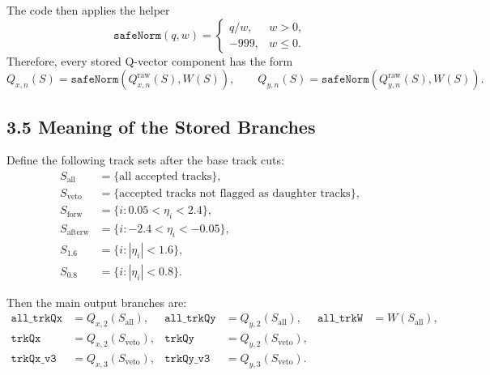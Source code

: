 \documentclass[11pt]{article}
\begin{document}
The code then applies the helper
\[
\texttt{safeNorm}(q,w) =
\begin{cases}
q/w, & w > 0,\\
-999, & w \le 0.
\end{cases}
\]
Therefore, every stored Q-vector component has the form
\[
Q_{x,n}(S) = \texttt{safeNorm}\!\left(Q_{x,n}^{\mathrm{raw}}(S), W(S)\right),\qquad
Q_{y,n}(S) = \texttt{safeNorm}\!\left(Q_{y,n}^{\mathrm{raw}}(S), W(S)\right).
\]

\subsection*{3.5 Meaning of the Stored Branches}

Define the following track sets after the base track cuts:
\begin{align*}
S_{\mathrm{all}} &= \{\text{all accepted tracks}\}, \\
S_{\mathrm{veto}} &= \{\text{accepted tracks not flagged as daughter tracks}\}, \\
S_{\mathrm{forw}} &= \{i : 0.05 < \eta_i < 2.4\}, \\
S_{\mathrm{afterw}} &= \{i : -2.4 < \eta_i < -0.05\}, \\
S_{1.6} &= \{i : |\eta_i| < 1.6\}, \\
S_{0.8} &= \{i : |\eta_i| < 0.8\}.
\end{align*}

Then the main output branches are:
\begin{align*}
\texttt{all\_trkQx} &= Q_{x,2}(S_{\mathrm{all}}), &
\texttt{all\_trkQy} &= Q_{y,2}(S_{\mathrm{all}}), &
\texttt{all\_trkW} &= W(S_{\mathrm{all}}), \\
\texttt{trkQx} &= Q_{x,2}(S_{\mathrm{veto}}), &
\texttt{trkQy} &= Q_{y,2}(S_{\mathrm{veto}}), \\
\texttt{trkQx\_v3} &= Q_{x,3}(S_{\mathrm{veto}}), &
\texttt{trkQy\_v3} &= Q_{y,3}(S_{\mathrm{veto}}).
\end{align*}
\end{document}
